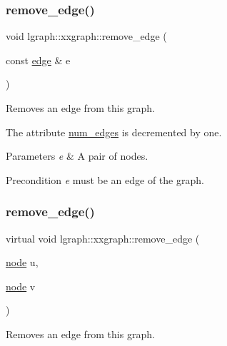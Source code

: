 \subsubsection{\texorpdfstring{remove\+\_\+edge()}{remove\_edge()}\hspace{0.1cm}{\footnotesize\ttfamily [1/2]}}
{\footnotesize\ttfamily void lgraph\+::xxgraph\+::remove\+\_\+edge (\begin{DoxyParamCaption}\item[{const \hyperlink{namespacelgraph_a76bd7d50719f03de7a85db259d80d572}{edge} \&}]{e }\end{DoxyParamCaption})}



Removes an edge from this graph. 

The attribute \hyperlink{classlgraph_1_1xxgraph_a6765a9a3be42f6e0f824635c593b35d7}{num\+\_\+edges} is decremented by one. 
\begin{DoxyParams}{Parameters}
{\em e} & A pair of nodes. \\
\hline
\end{DoxyParams}
\begin{DoxyPrecond}{Precondition}
{\itshape e} must be an edge of the graph. 
\end{DoxyPrecond}
\mbox{\label{classlgraph_1_1xxgraph_a7fd3a1309cde4f408c8d9d4cb3b898a8}} 
\subsubsection{\texorpdfstring{remove\+\_\+edge()}{remove\_edge()}\hspace{0.1cm}{\footnotesize\ttfamily [2/2]}}
{\footnotesize\ttfamily virtual void lgraph\+::xxgraph\+::remove\+\_\+edge (\begin{DoxyParamCaption}\item[{\hyperlink{namespacelgraph_a397169dd66adf725210a30fb7251773e}{node}}]{u,  }\item[{\hyperlink{namespacelgraph_a397169dd66adf725210a30fb7251773e}{node}}]{v }\end{DoxyParamCaption})\hspace{0.3cm}{\ttfamily [pure virtual]}}



Removes an edge from this graph. 

